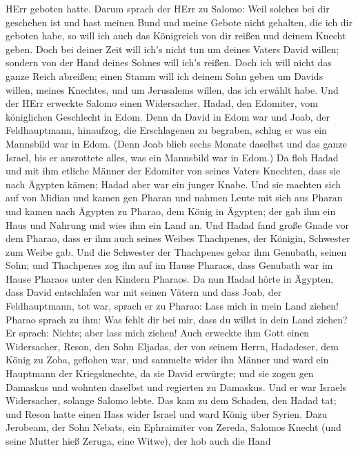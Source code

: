 HErr geboten hatte.  Darum sprach der HErr zu Salomo: Weil
solches bei dir geschehen ist und hast meinen Bund und meine Gebote
nicht gehalten, die ich dir geboten habe, so will ich auch das
Königreich von dir reißen und deinem Knecht geben.  Doch
bei deiner Zeit will ich's nicht tun um deines Vaters David willen;
sondern von der Hand deines Sohnes will ich's reißen.  Doch
ich will nicht das ganze Reich abreißen; einen Stamm will ich deinem
Sohn geben um Davids willen, meines Knechtes, und um Jerusalems willen,
das ich erwählt habe.  Und der HErr erweckte Salomo einen
Widersacher, Hadad, den Edomiter, vom königlichen Geschlecht in Edom.
 Denn da David in Edom war und Joab, der Feldhauptmann,
hinaufzog, die Erschlagenen zu begraben, schlug er was ein Mannsbild war
in Edom.  (Denn Joab blieb sechs Monate daselbst und das
ganze Israel, bis er ausrottete alles, was ein Mannsbild war in Edom.)
 Da floh Hadad und mit ihm etliche Männer der Edomiter von
seines Vaters Knechten, dass sie nach Ägypten kämen; Hadad aber war ein
junger Knabe.  Und sie machten sich auf von Midian und
kamen gen Pharan und nahmen Leute mit sich aus Pharan und kamen nach
Ägypten zu Pharao, dem König in Ägypten; der gab ihm ein Haus und
Nahrung und wies ihm ein Land an.  Und Hadad fand große
Gnade vor dem Pharao, dass er ihm auch seines Weibes Thachpenes, der
Königin, Schwester zum Weibe gab.  Und die Schwester der
Thachpenes gebar ihm Genubath, seinen Sohn; und Thachpenes zog ihn auf
im Hause Pharaos, dass Genubath war im Hause Pharaos unter den Kindern
Pharaos.  Da nun Hadad hörte in Ägypten, dass David
entschlafen war mit seinen Vätern und dass Joab, der Feldhauptmann, tot
war, sprach er zu Pharao: Lass mich in mein Land ziehen! 
Pharao sprach zu ihm: Was fehlt dir bei mir, dass du willst in dein Land
ziehen? Er sprach: Nichts; aber lass mich ziehen!  Auch
erweckte ihm Gott einen Widersacher, Reson, den Sohn Eljadas, der von
seinem Herrn, Hadadeser, dem König zu Zoba, geflohen war, 
und sammelte wider ihn Männer und ward ein Hauptmann der Kriegsknechte,
da sie David erwürgte; und sie zogen gen Damaskus und wohnten daselbst
und regierten zu Damaskus.  Und er war Israels Widersacher,
solange Salomo lebte. Das kam zu dem Schaden, den Hadad tat; und Reson
hatte einen Hass wider Israel und ward König über Syrien. 
Dazu Jerobeam, der Sohn Nebats, ein Ephraimiter von Zereda, Salomos
Knecht (und seine Mutter hieß Zeruga, eine Witwe), der hob auch die Hand
